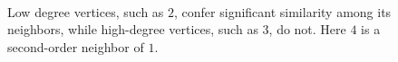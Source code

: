 \begin{figure}[hbtp]
  \centering
   \\[-2ex]
  \caption{Low degree vertices, such as $2$, confer significant similarity among its neighbors, while high-degree vertices, such as $3$, do not. Here $4$ is a second-order neighbor of $1$.}
  \label{fig:about-pruning}
\end{figure}
